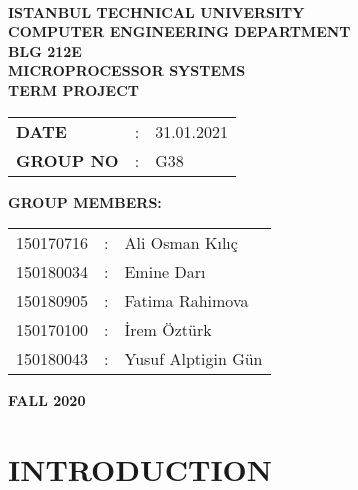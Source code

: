 \documentclass[pdftex,12pt,a4paper]{article}
\begin{document}
\begin{titlepage}
\begin{center}
\textbf{}\\
\textbf{\Large{ISTANBUL TECHNICAL UNIVERSITY}}\\
\vspace{0.5cm}
\textbf{\Large{COMPUTER ENGINEERING DEPARTMENT}}\\
\vspace{2cm}
\textbf{\Large{BLG 212E\\ MICROPROCESSOR SYSTEMS\\ TERM PROJECT}}\\
\vspace{2.8cm}
\begin{table}[ht]
\centering
\Large{
\begin{tabular}{lcl}
\textbf{DATE}  & : & 31.01.2021 \\
\textbf{GROUP NO}  & : & G38 \\
\end{tabular}}
\end{table}
\vspace{1cm}
\textbf{\Large{GROUP MEMBERS:}}\\
\begin{table}[ht]
\centering
\Large{
\begin{tabular}{rcl}
150170716  & : & Ali Osman Kılıç \\
150180034  & : & Emine Darı \\
150180905  & : & Fatima Rahimova \\
150170100  & : & İrem Öztürk \\
150180043  & : & Yusuf Alptigin Gün \\
\end{tabular}}
\end{table}
\vspace{2.8cm}
\textbf{\Large{FALL 2020}}

\end{center}

\end{titlepage}

\thispagestyle{empty}
\setcounter{tocdepth}{4}
\tableofcontents
\clearpage

\setcounter{page}{1}

\section{INTRODUCTION}
\end{document}
